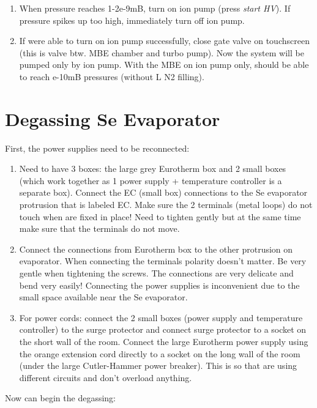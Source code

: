 \begin{enumerate}
\item	When pressure reaches 1-2e-9mB, turn on ion pump (press \emph{start HV}). If pressure spikes up too high, immediately turn off ion pump. 
\item	If were able to turn on ion pump successfully, close gate valve on touchscreen (this is valve btw. MBE chamber and turbo pump). Now the system will be pumped only by ion pump. With the MBE on ion pump only, should be able to reach e-10mB pressures (without L N2 filling).
\end{enumerate}

\section{Degassing Se Evaporator}
First, the power supplies need to be reconnected:
\begin{enumerate}
\item Need to have 3 boxes: the large grey Eurotherm box and 2 small boxes (which work together as 1 power supply + temperature controller is a separate box). Connect the EC (small box) connections to the Se evaporator protrusion that is labeled EC. Make sure the 2 terminals (metal loops) do not touch when are fixed in place! Need to tighten gently but at the same time make sure that the terminals do not move.
\item Connect the connections from Eurotherm box to the other protrusion on evaporator. When connecting the terminals polarity doesn’t matter. Be very gentle when tightening the screws. The connections are very delicate and bend very easily! Connecting the power supplies is inconvenient due to the small space available near the Se evaporator.
\item For power cords: connect the 2 small boxes (power supply and temperature controller) to the surge protector and connect surge protector to a socket on the short wall of the room. Connect the large Eurotherm power supply using the orange extension cord directly to a socket on the long wall of the room (under the large Cutler-Hammer power breaker). This is so that are using different circuits and don’t overload anything.
\end{enumerate}
Now can begin the degassing:
